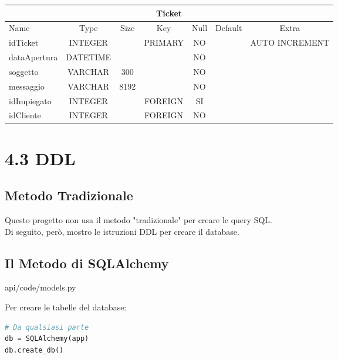 \begin{center}
    \begin{tabular}{ |l|c|c|c|c|c|c| } 
        \hline
        \multicolumn{7}{|c|}{Ticket} \\
        \hline
            Name             & Type     & Size  & Key       & Null  & Default   & Extra \\
        \hline
            idTicket         & INTEGER  &       & PRIMARY   & NO    &           & AUTO INCREMENT \\
            dataApertura     & DATETIME &       &           & NO    &           & \\
            soggetto         & VARCHAR  & 300   &           & NO    &           & \\
            messaggio        & VARCHAR  & 8192  &           & NO    &           & \\
            idImpiegato      & INTEGER  &       & FOREIGN   & SI    &           & \\
            idCliente        & INTEGER  &       & FOREIGN   & NO    &           & \\
        \hline
    \end{tabular}
\end{center}

\section*{4.3 \hspace{1cm} DDL}
\subsection*{Metodo Tradizionale}
Questo progetto non usa il metodo "tradizionale" per creare le query SQL. \\
Di seguito, però, mostro le istruzioni DDL per creare il database. \\


\subsection*{Il Metodo di SQLAlchemy}
\begin{verbatim*}
api/code/models.py
\end{verbatim*}




Per creare le tabelle del database:
\begin{lstlisting}[language=Python]
# Da qualsiasi parte
db = SQLAlchemy(app)
db.create_db()
\end{lstlisting}


